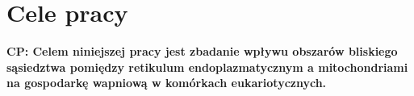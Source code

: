 \chapter{Cele pracy}
\label{chap:cele}
\bigskip

%
%


\textbf{CP: Celem niniejszej pracy jest zbadanie wpływu obszarów bliskiego sąsiedztwa pomiędzy retikulum endoplazmatycznym a mitochondriami na gospodarkę wapniową w komórkach eukariotycznych.}

\bigskip

